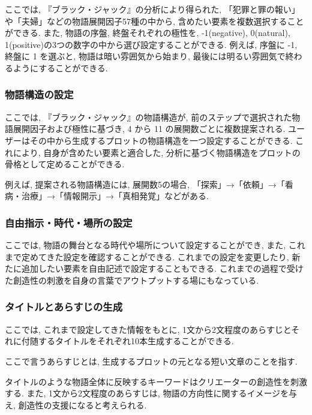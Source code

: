 ここでは, 『ブラック・ジャック』の分析により得られた, 「犯罪と罪の報い」や「夫婦」などの物語展開因子57種の中から, 含めたい要素を複数選択することができる. また, 物語の序盤, 終盤それぞれの極性を, -1(negative), 0(natural), 1(positive)の3つの数字の中から選び設定することができる. 例えば, 序盤に -1, 終盤に 1 を選ぶと, 物語は暗い雰囲気から始まり, 最後には明るい雰囲気で終わるようにすることができる.

\subsubsection{物語構造の設定}
ここでは, 『ブラック・ジャック』の物語構造が, 前のステップで選択された物語展開因子および極性に基づき, 4 から 11 の展開数ごとに複数提案される. ユーザーはその中から生成するプロットの物語構造を一つ設定することができる. これにより, 自身が含めたい要素と適合した, 分析に基づく物語構造をプロットの骨格として定めることができる.

例えば, 提案される物語構造には, 展開数5の場合, 「探索」→「依頼」→「看病・治療」→「情報開示」→「真相発覚」などがある.

\subsubsection{自由指示・時代・場所の設定}
ここでは, 物語の舞台となる時代や場所について設定することができ, また, これまで定めてきた設定を確認することができる. これまでの設定を変更したり, 新たに追加したい要素を自由記述で設定することもできる. これまでの過程で受けた創造性の刺激を自身の言葉でアウトプットする場にもなっている.

\subsubsection{タイトルとあらすじの生成}
ここでは, これまで設定してきた情報をもとに, 1文から2文程度のあらすじとそれに付随するタイトルをそれぞれ10本生成することができる. 

ここで言うあらすじとは, 生成するプロットの元となる短い文章のことを指す.

タイトルのような物語全体に反映するキーワードはクリエーターの創造性を刺激する. また, 1文から2文程度のあらすじは, 物語の方向性に関するイメージを与え, 創造性の支援になると考えられる.

